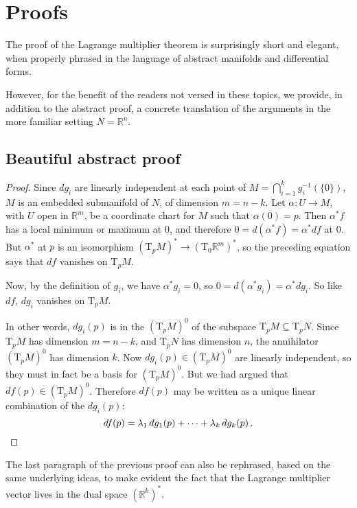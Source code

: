 \documentclass[12pt]{article}
\newcommand{\real}{\mathbb{R}}
\newcommand{\Tp}{\mathrm{T}_p}
\begin{document}
\section{Proofs}
The proof of the Lagrange multiplier theorem is surprisingly short and elegant,
when properly phrased in the language of abstract manifolds and 
differential forms.

However, for the benefit of the readers not versed in these topics,
we provide, in addition to the abstract proof, a concrete translation of the arguments
in the more familiar setting $N = \real^n$.

\subsection{Beautiful abstract proof}

\begin{proof}
Since $dg_i$ are linearly independent at each point of $M = \bigcap_{i=1}^k g_i^{-1}(\{ 0 \})$,
$M$ is an embedded submanifold of $N$,
of dimension $m = n-k$.  Let $\alpha\colon U \to M$, with $U$ open in $\real^m$, be
a coordinate chart for $M$ such that $\alpha(0) = p$.
Then $\alpha^* f$ has a local minimum or maximum at $0$,
and therefore $0 = d(\alpha^* f) = \alpha^* df$ at $0$.
But $\alpha^*$ at $p$ is an isomorphism $\left(\Tp M\right)^* \to \left(\mathrm{T}_0 \real^m\right)^*$,
so the preceding equation says that $df$ vanishes on $\Tp M$.

Now, by the definition of $g_i$, we have $\alpha^* g_i = 0$,
so $0 = d(\alpha^* g_i) = \alpha^* dg_i$.  So like $df$, $dg_i$ vanishes on $\Tp M$.

In other words, $dg_i(p)$ is in the 
$\left( \Tp M \right)^0$ of the subspace $\Tp M \subseteq \Tp N$.
Since $\Tp M$ has dimension $m = n - k$, and $\Tp N$ has dimension $n$,
the annihilator $\left(\Tp M\right)^0$ has dimension $k$.
Now $dg_i(p) \in \left(\Tp M\right)^0$ are linearly independent, 
so they must in fact be a basis for $\left(\Tp M\right)^0$.
But we had argued that $df(p) \in \left(\Tp M\right)^0$.
Therefore $df(p)$ may be written as a unique linear combination
of the $dg_i(p)$:
\[
d f(p) = \lambda_1 \, d g_1(p) + \dotsb + \lambda_k \, d g_k(p)\,.
\qedhere
\]
\end{proof}

The last paragraph of the previous proof can also be rephrased,
based on the same underlying ideas,
to make evident the fact that the Lagrange multiplier vector
lives in the dual space $(\real^k)^*$.  
\end{document}
